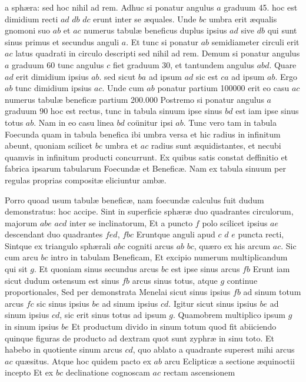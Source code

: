 \documentclass[11pt,a4paper]{article}
\begin{document}
a sphæra: sed hoc nihil ad rem. Adhuc si ponatur angulus
$a$ graduum 45. hoc est dimidium recti $ad$ $db$ $dc$ erunt inter
se æquales. Unde $bc$ umbra erit æqualis gnomoni suo $ab$ et
$ac$ numerus tabulæ beneficus duplus ipsius $ad$ sive $db$ qui
sunt sinus primus et secundus anguli $a$. Et tunc si ponatur $ab$
semidiameter circuli erit $ac$ latus quadrati in circulo descripti
sed nihil ad rem. Demum si ponatur angulus $a$ graduum 60
tunc angulus $c$ fiet graduum 30, et tantundem angulus $abd$.
Quare $ad$ erit dimidium ipsius $ab$. sed sicut $ba$ ad ipsum $ad$ sic
est $ca$ ad ipsum $ab$. Ergo $ab$ tunc dimidium ipsius $ac$. Unde
cum $ab$ ponatur partium 100000 erit eo casu $ac$ numerus
tabulæ beneficæ partium 200.000 Postremo si ponatur angulus
$a$ graduum 90 hoc est rectus, tunc in tabula sinuum ipse sinus
$bd$ est iam ipse sinus totus $ab$. Nam in eo casu linea $bd$ coünitur ipsi
$ab$. Tunc vero tam in tabula Foecunda quam in tabula benefica
ibi umbra versa et hic radius in infinitum abeunt, quoniam scilicet
$bc$ umbra et $ac$ radius sunt æquidistantes, et necubi quamvis in
infinitum producti concurrunt. Ex quibus satis constat deffinitio et
fabrica ipsarum tabularum Foecundæ et Beneficæ. Nam ex tabula sinuum
per regulas proprias compositæ eliciuntur ambæ.

Porro quoad usum tabulæ
beneficæ, nam foecundæ calculus fuit dudum demonstratus: hoc accipe.
Sint in superficie sphæræ duo quadrantes circulorum, majorum $abe$
$acd$ inter se inclinatorum, Et a puncto $f$ polo scilicet ipsius $ae$ descendant
duo quadrantes $fed$, $fbc$ Eruntque anguli apud $c$ $d$ $e$ puncta
recti, Sintque ex triangulo sphærali $abc$ cogniti arcus $ab$ $bc$, quæro
ex his arcum $ac$. Sic cum arcu $bc$ intro in tabulam Beneficam, Et
excipio numerum multiplicandum qui sit $g$. Et quoniam sinus
secundus arcus $bc$ est ipse sinus arcus $fb$ Erunt iam sicut dudum
ostensum est sinus $fb$ arcus sinus totus, atque $g$ continue proportionales,
Sed per demonstrata Menelai sicut sinus ipsius $fb$ ad sinum
totum arcus $fc$ sic sinus ipsius $be$ ad sinum ipsius $cd$. Igitur
sicut sinus ipsius $be$ ad sinum ipsius $cd$, sic erit sinus totus ad
ipsum $g$. Quamobrem multiplico ipsum $g$ in sinum ipsius $be$
Et productum divido in sinum totum quod fit abiiciendo quinque
 figuras de producto ad dextram quot sunt zyphræ in sinu toto.
Et habebo in quotiente sinum arcus $cd$, quo ablato a quadrante
superest mihi arcus $ac$ quæsitus. Atque hoc quidem pacto ex $ab$ arcu
Eclipticæ a sectione æquinoctii incepto Et ex $bc$ declinatione cognoscam
$ac$ rectam ascensionem
\end{document}

